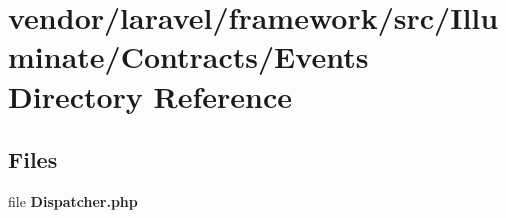 \section{vendor/laravel/framework/src/\+Illuminate/\+Contracts/\+Events Directory Reference}
\label{dir_e89f3546134b4348c00cfc8d116c436b}
\subsection*{Files}
\begin{DoxyCompactItemize}
\item 
file {\bf Dispatcher.\+php}
\end{DoxyCompactItemize}
